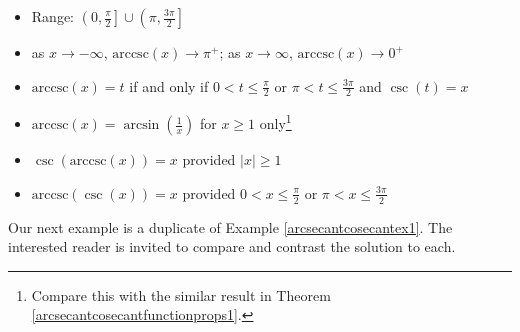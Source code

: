 \documentclass[12pt]{ximera}
\begin{document}
\begin{theorem}
\begin{itemize}
\begin{itemize}
\item Range: $\left(0, \frac{\pi}{2} \right] \cup \left( \pi, \frac{3\pi}{2} \right]$

\item  as $x \rightarrow -\infty$, $\mbox{arccsc}(x) \rightarrow \pi^{+}$;  as $x \rightarrow \infty$, $\mbox{arccsc}(x) \rightarrow 0^{+}$

\item  $\mbox{arccsc}(x) = t$ if and only if $0 < t \leq \frac{\pi}{2}$ or $\pi < t \leq \frac{3\pi}{2}$ and $\csc(t) = x$

\item  $\mbox{arccsc}(x) = \arcsin\left(\frac{1}{x}\right)$ for $x \geq 1$ only\footnote{Compare this with the similar result in Theorem \ref{arcsecantcosecantfunctionprops1}.}

\item  $\csc\left(\mbox{arccsc}(x)\right) = x$ provided $|x| \geq 1$

\item  $\mbox{arccsc}(\csc(x)) = x$ provided $0 < x \leq \frac{\pi}{2}$ or $\pi < x \leq \frac{3\pi}{2}$

\end{itemize}

\end{itemize}

\end{theorem}


\medskip

Our next example is a duplicate of Example \ref{arcsecantcosecantex1}.  The interested reader is invited to compare and contrast the solution to each.
\end{document}
